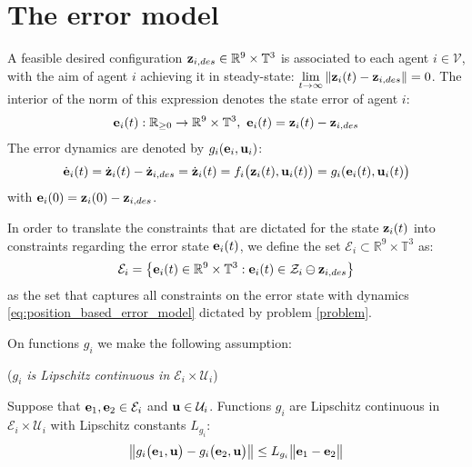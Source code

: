 \section{The error model}

A feasible desired configuration
$\bm{\mathbf{z}}_{i,des} \in \mathbb{R}^9 \times \mathbb{T}^3$
is associated to each agent $i \in \mathcal{V}$, with the aim of agent $i$
achieving it in steady-state:
$\lim\limits_{t \to \infty} \|\bm{\mathbf{z}}_i(t) - \bm{\mathbf{z}}_{i,des}\| = 0$. The
interior of the norm of this expression denotes the state error of agent $i$:
\begin{align}
  \bm{\mathbf{e}}_i(t) : \mathbb{R}_{\geq 0} \to \mathbb{R}^9 \times \mathbb{T}^3,\
  \bm{\mathbf{e}}_i(t) = \bm{\mathbf{z}}_i(t) - \bm{\mathbf{z}}_{i,des}
\end{align}
The error dynamics are denoted by $g_i(\bm{\mathbf{e}}_i, \bm{\mathbf{u}}_i)$:
\begin{align}
  \dot{\bm{\mathbf{e}}}_i(t) = \dot{\bm{\mathbf{z}}}_i(t) - \dot{\bm{\mathbf{z}}}_{i,des} =
  \dot{\bm{\mathbf{z}}}_i(t) = f_i\big(\bm{\mathbf{z}}_i(t), \bm{\mathbf{u}}_i(t)\big) = g_i(\bm{\mathbf{e}}_i(t), \bm{\mathbf{u}}_i(t)\big)
  \label{eq:position_based_error_model}
\end{align}
with $\bm{\mathbf{e}}_i(0) = \bm{\mathbf{z}}_i(0) - \bm{\mathbf{z}}_{i,des}$.

In order to translate
the constraints that are dictated for the state $\bm{\mathbf{z}}_i(t)$ into constraints
regarding the error state $\bm{\mathbf{e}}_i(t)$, we define the set
$\mathcal{E}_i \subset \mathbb{R}^9 \times \mathbb{T}^3$ as:
$$\mathcal{E}_i = \big\{\bm{\mathbf{e}}_i(t) \in \mathbb{R}^9 \times \mathbb{T}^3 :
\bm{\mathbf{e}}_i(t) \in \mathcal{Z}_i \ominus \bm{\mathbf{z}}_{i,des}\big\}$$
as the set that captures all constraints on the error state with dynamics
\eqref{eq:position_based_error_model} dictated by problem \eqref{problem}.

On functions $g_i$ we make the following assumption:
\begin{bw_box}
  \begin{assumption} (\textit{$g_i$ is Lipschitz continuous in $\mathcal{E}_i \times \mathcal{U}_i$})
  \label{ass:g_i_Lipschitz}

    Suppose that $\bm{\mathbf{e}}_1, \bm{\mathbf{e}}_2 \in \mathcal{E}_i$ and
    $\bm{\mathbf{u}} \in \mathcal{U}_i$. Functions $g_i$ are Lipschitz continuous in
    $\mathcal{E}_i \times \mathcal{U}_i$ with Lipschitz constants $L_{g_i}$:
    \begin{align}
      \big\|g_i\big(\bm{\mathbf{e}}_1, \bm{\mathbf{u}} \big) - g_i\big(\bm{\mathbf{e}}_2, \bm{\mathbf{u}} \big)\big\|
        \leq L_{g_i} \big\|\bm{\mathbf{e}}_1 - \bm{\mathbf{e}}_2\big\|
    \end{align}

\end{assumption}
\end{bw_box}

